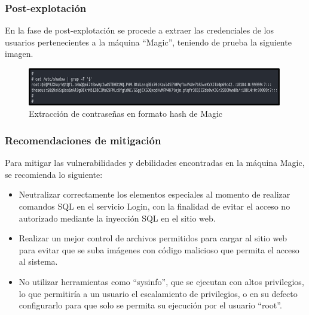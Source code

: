 \subsubsection{Post-explotación}
En la fase de post-explotación se procede a extraer las credenciales de los usuarios pertenecientes a la máquina “Magic”, teniendo de prueba la siguiente imagen.
\begin{figure}[H]
    \centering
    \includegraphics[width=0.99\textwidth]{imagenes/hashmag.png}
    \caption{Extracción de contraseñas en formato hash de Magic}
\end{figure}
\subsubsection{Recomendaciones de mitigación}
Para mitigar las vulnerabilidades y debilidades encontradas en la máquina Magic, se recomienda lo siguiente:
\begin{itemize}
    \item Neutralizar correctamente los elementos especiales al momento de realizar comandos SQL en el servicio Login, con la finalidad de evitar el acceso no autorizado mediante la inyección SQL en el sitio web.
    \item Realizar un mejor control de archivos permitidos para cargar al sitio web para evitar que se suba imágenes con código malicioso que permita el acceso al sistema.
    \item No utilizar herramientas como “sysinfo”, que se ejecutan con altos privilegios, lo que permitiría a un usuario el escalamiento de privilegios, o en su defecto configurarlo para que solo se permita su ejecución por el usuario “root”.
\end{itemize}